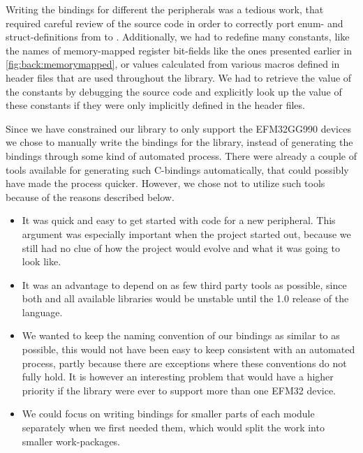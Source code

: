 Writing the bindings for different the peripherals was a tedious work, that required careful review of the \emlib source code in order to correctly port enum- and struct-definitions from {\C} to {\rust}.
Additionally, we had to redefine many constants, like the names of memory-mapped register bit-fields like the ones presented earlier in \autoref{fig:back:memorymapped}, or values calculated from various {\C} macros defined in header files that are used throughout the library.
We had to retrieve the value of the constants by debugging the source code and explicitly look up the value of these constants if they were only implicitly defined in the header files.

Since we have constrained our library to only support the EFM32GG990 devices we chose to manually write the bindings for the library, instead of generating the bindings through some kind of automated process.
There were already a couple of tools available for generating such C-bindings automatically, that could possibly have made the process quicker.
However, we chose not to utilize such tools because of the reasons described below.

\begin{itemize}
    \item It was quick and easy to get started with code for a new peripheral.
    This argument was especially important when the project started out, because we still had no clue of how the project would evolve and what it was going to look like.

    \item It was an advantage to depend on as few third party tools as possible, since both {\rust} and all available libraries would be unstable until the 1.0 release of the language.

    \item We wanted to keep the naming convention of our bindings as similar to \emlib as possible, this would not have been easy to keep consistent with an automated process, partly because there are exceptions where these conventions do not fully hold.
    It is however an interesting problem that would have a higher priority if the library were ever to support more than one EFM32 device.

    \item We could focus on writing bindings for smaller parts of each module separately when we first needed them, which would split the work into smaller work-packages.
\end{itemize}

